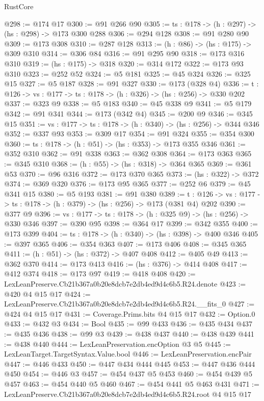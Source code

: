 \begin{lexlean}{RustCore}
\begin{coremodule}
@298 := @174 @17
@300 := @91 @266 @90
@305 := {ts : @178} -> (h : @297) -> (hs : @298) -> @173 @300 @288
@306 := @294 @128
@308 := @91 @280 @90
@309 := @173 @308
@310 := @287 @128
@313 := (h : @86) -> (hs : @175) -> @309 @310
@314 := @306 @84
@316 := @91 @295 @90
@318 := @173 @316 @310
@319 := (hs : @175) -> @318
@320 := @314 @172
@322 := @173 @93 @310
@323 := @252 @52
@324 := @5 @181
@325 := @45 @324
@326 := @325 @15
@327 := @5 @187
@328 := @91 @327
@330 := @173 (@328 @4)
@336 := {t : @126} -> {vs : @177} -> {ts : @178} -> (h : @326) -> (hs : @256) -> @330 @202
@337 := @323 @9
@338 := @5 @183
@340 := @45 @338 @9
@341 := @5 @179
@342 := @91 @341
@344 := @173 (@342 @4)
@345 := @200 @9
@346 := @345 @15
@351 := {vs : @177} -> {ts : @178} -> (h : @340) -> (hs : @256) -> @344 @346
@352 := @337 @93
@353 := @309 @17
@354 := @91 @324
@355 := @354 @300
@360 := {ts : @178} -> (h : @51) -> (hs : @353) -> @173 @355 @346
@361 := @352 @310
@362 := @91 @338
@363 := @362 @308
@364 := @173 @363
@365 := @345 @310
@368 := (h : @55) -> (hs : @318) -> @364 @365
@369 := @361 @53
@370 := @96 @316
@372 := @173 @370 @365
@373 := (hs : @322) -> @372
@374 := @369 @320
@376 := @173 @95 @365
@377 := @252 @6
@379 := @45 @341 @15
@380 := @5 @193
@381 := @91 @380
@389 := {t : @126} -> {vs : @177} -> {ts : @178} -> (h : @379) -> (hs : @256) -> @173 (@381 @4) @202
@390 := @377 @9
@396 := {vs : @177} -> {ts : @178} -> (h : @325 @9) -> (hs : @256) -> @330 @346
@397 := @390 @95
@398 := @364 @17
@399 := @342 @355
@400 := @173 @399
@404 := {ts : @178} -> (h : @340) -> (hs : @398) -> @400 @346
@405 := @397 @365
@406 := @354 @363
@407 := @173 @406
@408 := @345 @365
@411 := (h : @51) -> (hs : @372) -> @407 @408
@412 := @405 @49
@413 := @362 @370
@414 := @173 @413
@416 := (hs : @376) -> @414 @408
@417 := @412 @374
@418 := @173 @97
@419 := @418 @408
@420 := LexLeanPreserve.Cb21b367a0b20e8dcb7e2db4ed9d4c6b5.R24.denote
@423 := @420 @4 @15 @17
@424 := LexLeanPreserve.Cb21b367a0b20e8dcb7e2db4ed9d4c6b5.R24.__fits_0
@427 := @424 @4 @15 @17
@431 := Coverage.Prims.bits @4 @15 @17
@432 := Option.{0}
@433 := @432 @3
@434 := Bool
@435 := @99 @433
@436 := @435 @434
@437 := @435 @436
@438 := @99 @3
@439 := @438 @437
@440 := @438 @439
@441 := @438 @440
@444 := LexLeanPreservation.encOption @3 @5
@445 := LexLeanTarget.TargetSyntax.Value.bool
@446 := LexLeanPreservation.encPair
@447 := @446 @433
@450 := @447 @434 @444 @445
@453 := @447 @436 @444 @450
@454 := @446 @3
@457 := @454 @437 @5 @453
@460 := @454 @439 @5 @457
@463 := @454 @440 @5 @460
@467 := @454 @441 @5 @463 @431
@471 := LexLeanPreserve.Cb21b367a0b20e8dcb7e2db4ed9d4c6b5.R24.root @4 @15 @17

\end{coremodule}
\end{lexlean}
